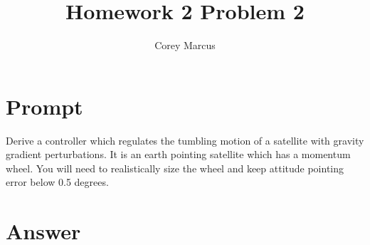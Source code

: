 \documentclass[]{article}
\title{Homework 2 Problem 2}
\author{Corey Marcus}
\begin{document}
\maketitle

\newcommand{\CrossProd}[1]{\left[ #1 \times \right]}

\section{Prompt}

Derive a controller which regulates the tumbling motion of a satellite with gravity gradient perturbations. It is an earth pointing satellite which has a momentum wheel. You will need to realistically size the wheel and keep attitude pointing error below 0.5 degrees.

\section{Answer}
\end{document}
